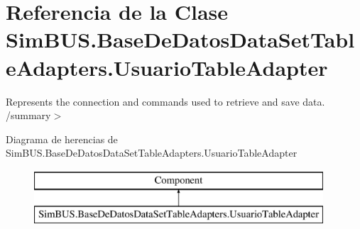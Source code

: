 \section{Referencia de la Clase Sim\-B\-U\-S.\-Base\-De\-Datos\-Data\-Set\-Table\-Adapters.\-Usuario\-Table\-Adapter}
\label{class_sim_b_u_s_1_1_base_de_datos_data_set_table_adapters_1_1_usuario_table_adapter}


Represents the connection and commands used to retrieve and save data. /summary$>$  


Diagrama de herencias de Sim\-B\-U\-S.\-Base\-De\-Datos\-Data\-Set\-Table\-Adapters.\-Usuario\-Table\-Adapter\begin{figure}[H]
\begin{center}
\leavevmode
\includegraphics[height=2.000000cm]{class_sim_b_u_s_1_1_base_de_datos_data_set_table_adapters_1_1_usuario_table_adapter}
\end{center}
\end{figure}
